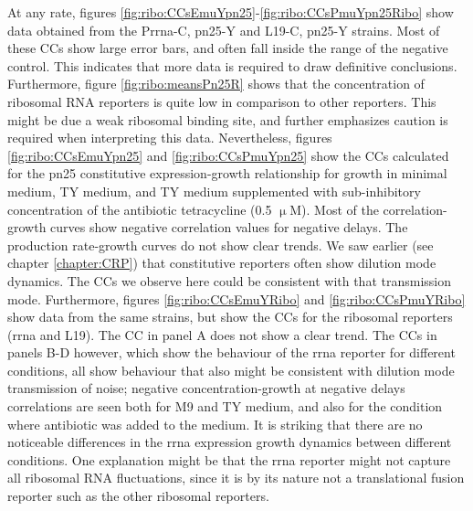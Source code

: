 At any rate, figures \ref{fig:ribo:CCsEmuYpn25}-\ref{fig:ribo:CCsPmuYpn25Ribo} show data obtained from the Prrna-C, pn25-Y and L19-C, pn25-Y strains.
%
Most of these CCs show large error bars, and often fall inside the range of the negative control.
This indicates that more data is required to draw definitive conclusions.
Furthermore, figure \ref{fig:ribo:meansPn25R} shows that the concentration of ribosomal RNA reporters is quite low in comparison to other reporters. This might be due a weak ribosomal binding site, 
and further emphasizes caution is required when interpreting this data.
%
Nevertheless, figures \ref{fig:ribo:CCsEmuYpn25} and \ref{fig:ribo:CCsPmuYpn25} show the CCs calculated for the pn25 constitutive expression-growth relationship for growth in minimal medium, TY medium, and TY medium supplemented with sub-inhibitory concentration of the antibiotic tetracycline (0.5 $\upmu$M).
%
Most of the correlation-growth curves show negative correlation values for negative delays.
The production rate-growth curves do not show clear trends.
We saw earlier (see chapter \ref{chapter:CRP}) that constitutive reporters often show dilution mode dynamics.
The CCs we observe here could be consistent with that transmission mode.
%
Furthermore, figures \ref{fig:ribo:CCsEmuYRibo} and \ref{fig:ribo:CCsPmuYRibo} show data from the same strains, but show the CCs for the ribosomal reporters (rrna and L19).
The CC in panel A does not show a clear trend.
The CCs in panels B-D however, which show the behaviour of the rrna reporter for different conditions, all show behaviour that also might be consistent with dilution mode transmission of noise; negative concentration-growth at negative delays correlations are seen both for M9 and TY medium, and also for the condition where antibiotic was added to the medium.
%
It is striking that there are no noticeable differences in the rrna expression growth dynamics between different conditions.
%
One explanation might be that the rrna reporter might not capture all ribosomal RNA fluctuations, since it is by its nature not a translational fusion reporter such as the other ribosomal reporters.



